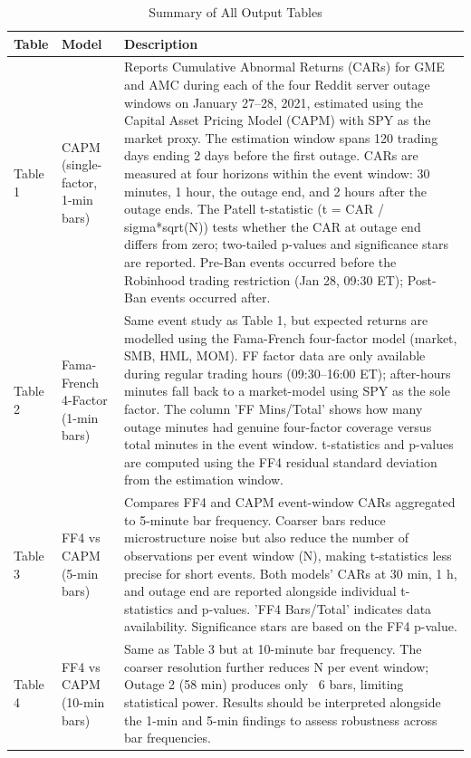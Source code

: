 \begin{table}[htbp]
  \centering
  \caption{Summary of All Output Tables}
  \label{tab:descriptions}
  \begin{tabular}{llp{9cm}}
    \hline\hline
    Table & Model & Description \\
    \hline
    Table 1 & CAPM (single-factor, 1-min bars) & Reports Cumulative Abnormal Returns (CARs) for GME and AMC during each of the four Reddit server outage windows on January 27–28, 2021, estimated using the Capital Asset Pricing Model (CAPM) with SPY as the market proxy. The estimation window spans 120 trading days ending 2 days before the first outage. CARs are measured at four horizons within the event window: 30 minutes, 1 hour, the outage end, and 2 hours after the outage ends. The Patell t-statistic (t = CAR / sigma*sqrt(N)) tests whether the CAR at outage end differs from zero; two-tailed p-values and significance stars are reported. Pre-Ban events occurred before the Robinhood trading restriction (Jan 28, 09:30 ET); Post-Ban events occurred after. \\
    \hline
    Table 2 & Fama-French 4-Factor (1-min bars) & Same event study as Table 1, but expected returns are modelled using the Fama-French four-factor model (market, SMB, HML, MOM). FF factor data are only available during regular trading hours (09:30–16:00 ET); after-hours minutes fall back to a market-model using SPY as the sole factor. The column 'FF Mins/Total' shows how many outage minutes had genuine four-factor coverage versus total minutes in the event window. t-statistics and p-values are computed using the FF4 residual standard deviation from the estimation window. \\
    \hline
    Table 3 & FF4 vs CAPM (5-min bars) & Compares FF4 and CAPM event-window CARs aggregated to 5-minute bar frequency. Coarser bars reduce microstructure noise but also reduce the number of observations per event window (N), making t-statistics less precise for short events. Both models' CARs at 30 min, 1 h, and outage end are reported alongside individual t-statistics and p-values. 'FF4 Bars/Total' indicates data availability. Significance stars are based on the FF4 p-value. \\
    \hline
    Table 4 & FF4 vs CAPM (10-min bars) & Same as Table 3 but at 10-minute bar frequency. The coarser resolution further reduces N per event window; Outage 2 (58 min) produces only ~6 bars, limiting statistical power. Results should be interpreted alongside the 1-min and 5-min findings to assess robustness across bar frequencies. \\

\end{tabular}
\end{table}
